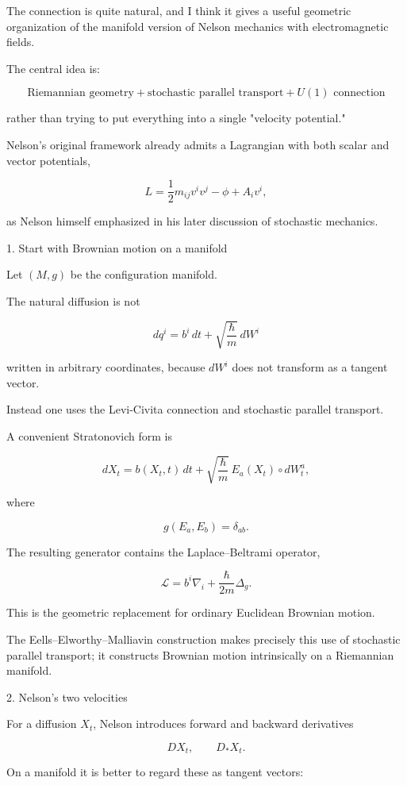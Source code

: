The connection is quite natural, and I think it gives a useful geometric organization of the manifold version of Nelson mechanics with electromagnetic fields.

The central idea is:

$$ \boxed{ \text{Riemannian geometry} + \text{stochastic parallel transport} + U(1)\text{ connection} } $$

rather than trying to put everything into a single "velocity potential."

Nelson's original framework already admits a Lagrangian with both scalar and vector potentials,

$$ L=\frac12 m_{ij}v^iv^j-\phi+A_iv^i, $$

as Nelson himself emphasized in his later discussion of stochastic mechanics.

1. Start with Brownian motion on a manifold

Let \((M,g)\) be the configuration manifold.

The natural diffusion is not

$$ dq^i=b^i\,dt+\sqrt{\frac{\hbar}{m}}\,dW^i $$

written in arbitrary coordinates, because \(dW^i\) does not transform as a tangent vector.

Instead one uses the Levi-Civita connection and stochastic parallel transport.

A convenient Stratonovich form is

$$ \boxed{ dX_t=b(X_t,t)\,dt + \sqrt{\frac{\hbar}{m}}\, E_a(X_t)\circ dW_t^a , } $$

where

$$ g(E_a,E_b)=\delta_{ab}. $$

The resulting generator contains the Laplace--Beltrami operator,

$$ \mathcal L = b^i\nabla_i + \frac{\hbar}{2m}\Delta_g. $$

This is the geometric replacement for ordinary Euclidean Brownian motion.

The Eells--Elworthy--Malliavin construction makes precisely this use of stochastic parallel transport; it constructs Brownian motion intrinsically on a Riemannian manifold.

2. Nelson's two velocities

For a diffusion \(X_t\), Nelson introduces forward and backward derivatives

$$ D X_t, \qquad D_*X_t. $$

On a manifold it is better to regard these as tangent vectors:

